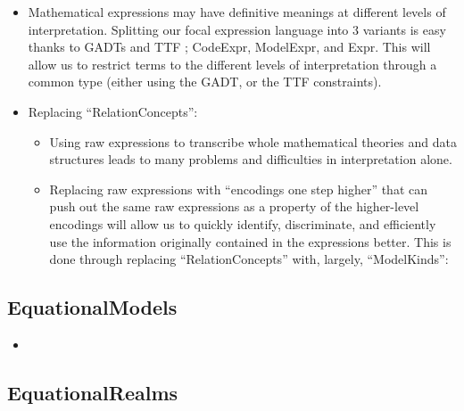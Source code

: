 \begin{itemize}

	\item Mathematical expressions may have definitive meanings at different
	      levels of interpretation. Splitting our focal expression language into
	      3 variants is easy thanks to GADTs and TTF \cite{carette2009finally};
	      CodeExpr, ModelExpr, and Expr. This will allow us to restrict terms to
	      the different levels of interpretation through a common type (either
	      using the GADT, or the TTF constraints).

	\item Replacing ``RelationConcepts'':

	      \begin{itemize}

		      \item Using raw expressions to transcribe whole mathematical
		            theories and data structures leads to many problems
		            and difficulties in interpretation alone.

		      \item Replacing raw expressions with ``encodings one step
		            higher'' that can push out the same raw expressions
		            as a property of the higher-level encodings will
		            allow us to quickly identify, discriminate, and efficiently
		            use the information originally contained in the expressions
		            better. This is done through replacing ``RelationConcepts''
		            with, largely, ``ModelKinds'':

	      \end{itemize}

\end{itemize}


\subsection{EquationalModels}

\begin{itemize}

	\item {}

\end{itemize}

\subsection{EquationalRealms}

